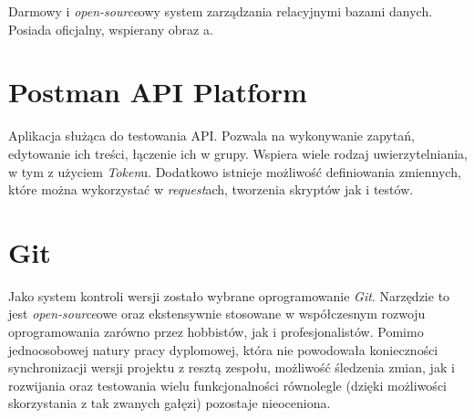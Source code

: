\par Darmowy i \emph{open-source}owy system zarządzania relacyjnymi bazami danych. Posiada oficjalny, wspierany obraz \emph{\docker}a.

\section{Postman API Platform}

\par Aplikacja służąca do testowania API. Pozwala na wykonywanie zapytań, edytowanie ich treści, łączenie ich w grupy. Wspiera wiele rodzaj uwierzytelniania, w tym z użyciem \emph{Token}u. Dodatkowo istnieje możliwość definiowania zmiennych, które można wykorzystać w \emph{request}ach, tworzenia skryptów jak i testów\cite{POSTMAN_DOCUMENTATION}.

\section{Git}

\par Jako system kontroli wersji zostało wybrane oprogramowanie \emph{Git}. Narzędzie to jest \emph{open-source}owe oraz ekstensywnie stosowane w współczesnym rozwoju oprogramowania zarówno przez hobbistów, jak i profesjonalistów. Pomimo jednoosobowej natury pracy dyplomowej, która nie powodowała konieczności synchronizacji wersji projektu z resztą zespołu, możliwość śledzenia zmian, jak i rozwijania oraz testowania wielu funkcjonalności równolegle (dzięki możliwości skorzystania z tak zwanych gałęzi) pozostaje nieoceniona.